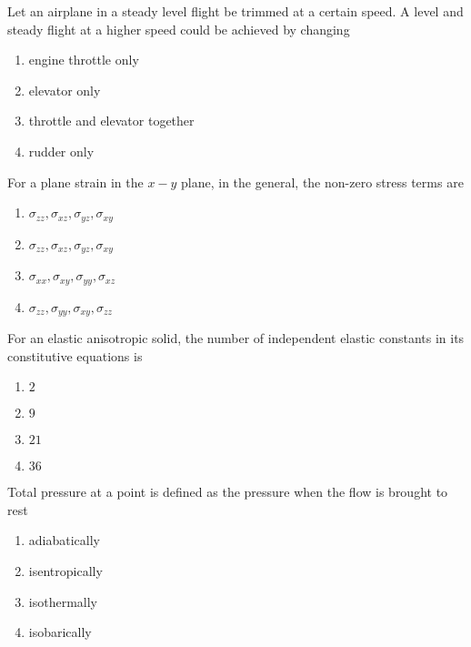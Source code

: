     \item Let an airplane in a steady level flight be trimmed at a certain speed. A level and steady flight at a higher speed could be achieved by changing 
    \begin{enumerate}
        \item engine throttle only
        \item elevator only
        \item throttle and elevator together 
        \item rudder only \\
    \end{enumerate}

    \item For a plane strain in the $x-y$ plane, in the general, the non-zero stress terms are 
    \begin{enumerate}
        \item $\sigma_{zz} , \sigma_{xz}, \sigma_{yz}, \sigma_{xy}$
        \item $\sigma_{zz} , \sigma_{xz}, \sigma_{yz}, \sigma_{xy}$
        \item $\sigma_{xx} , \sigma_{xy}, \sigma_{yy}, \sigma_{xz}$
        \item $\sigma_{zz} , \sigma_{yy}, \sigma_{xy}, \sigma_{zz}$
    \end{enumerate}

    \item For an elastic anisotropic solid, the number of independent elastic constants in its constitutive equations is 
    \begin{enumerate}
        \item $2$
        \item $9$
        \item $21$
        \item $36$
    \end{enumerate}

    \item Total pressure at a point is defined as the pressure when the flow is brought to rest 
    \begin{enumerate}
        \item adiabatically
        \item isentropically
        \item isothermally
        \item isobarically \\
    \end{enumerate}

